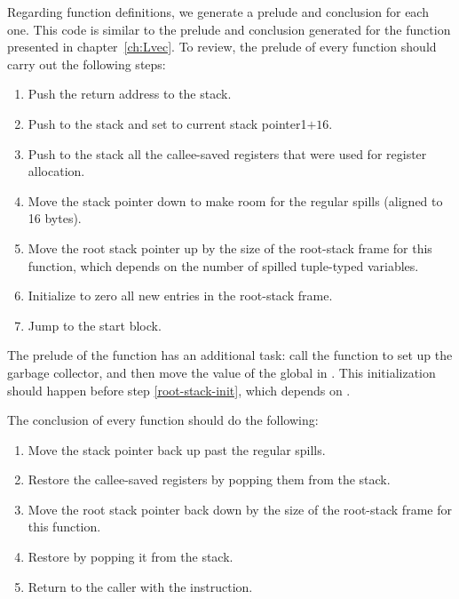 \documentclass[7x10]{TimesAPriori_MIT}%
\def\riscvEd{1}
\def\architecture{1}
\newcommand\ifriscv[1]{\if\architecture\riscvEd{#1}\fi}
\numberwithin{theorem}{chapter}
\numberwithin{definition}{chapter}
\numberwithin{equation}{chapter}
\begin{document}
Regarding function definitions, we generate a prelude and conclusion
for each one. This code is similar to the prelude and conclusion
generated for the  function presented in
chapter~\ref{ch:Lvec}. To review, the prelude of every function should
carry out the following steps:
\begin{enumerate}
  \if\architecture\riscvEd
\item Push the return address  to the stack.
  \fi
\item Push \FP{} to the stack and set {\FP} to current stack
  pointer\ifriscv{$+16$}.
\item Push to the stack all the callee-saved registers that were
  used for register allocation.
\item Move the stack pointer {\SP} down to make room for the
  regular spills (aligned to 16 bytes).
\item Move the root stack pointer {\ROOTSP} up by the size of the
  root-stack frame for this function, which depends on the number of
  spilled tuple-typed variables. \label{root-stack-init}
\item Initialize to zero all new entries in the root-stack frame.
\item Jump to the start block.
\end{enumerate}
The prelude of the  function has an additional task: call
the  function to set up the garbage collector, and
then move the value of the global  in
\ROOTSP. This initialization should happen before step
\ref{root-stack-init}, which depends on \ROOTSP.

The conclusion of every function should do the following:
\begin{enumerate}
\item Move the stack pointer back up past the regular spills.
\item Restore the callee-saved registers by popping them from the
  stack.
\item Move the root stack pointer back down by the size of the
  root-stack frame for this function.
\item Restore \FP by popping it from the stack.
\item Return to the caller with the \RET{} instruction.
\end{enumerate}
\end{document}

